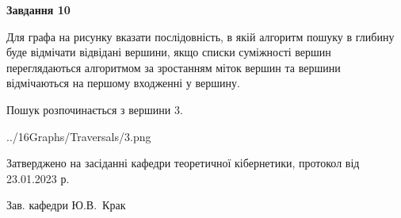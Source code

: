 \documentclass[12pt, ukrainian]{article}
\begin{document}
{\begin {large}
{\begin {center}\textbf{Завдання 10}\end {center}}\par
Для графа на рисунку вказати послідовність, в якій алгоритм пошуку в глибину буде відмічати відвідані вершини, якщо списки суміжності вершин переглядаються алгоритмом за зростанням міток вершин та вершини відмічаються на першому вход\-женні у вершину.\par
Пошук розпочинається з вершини 3.\par

\begin{center}
	{../16Graphs/Traversals/3.png}
\end{center}\par
\newpage


\end {large}
}
{\smallskip \begin {small} Затверджено на засіданні кафедри теоретичної кібернетики, протокол  від   23.01.2023 р.\par\smallskip\smallskip
{\parbox {6.5 cm}{Зав. кафедри \dotfill Ю.В.~Крак}} \end{small}}
\end{document}
